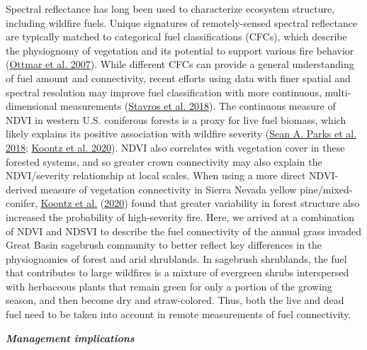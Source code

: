 \documentclass[
  12pt,
]{article}
\begin{document}
Spectral reflectance has long been used to characterize ecosystem
structure, including wildfire fuels. Unique signatures of
remotely-sensed spectral reflectance are typically matched to
categorical fuel classifications (CFCs), which describe the physiognomy
of vegetation and its potential to support various fire behavior
(\protect\hyperlink{ref-Ottmar2007}{Ottmar et al. 2007}). While
different CFCs can provide a general understanding of fuel amount and
connectivity, recent efforts using data with finer spatial and spectral
resolution may improve fuel classification with more continuous,
multi-dimensional measurements
(\protect\hyperlink{ref-Stavros2018}{Stavros et al. 2018}). The
continuous measure of NDVI in western U.S. coniferous forests is a proxy
for live fuel biomass, which likely explains its positive association
with wildfire severity (\protect\hyperlink{ref-Parks2018}{Sean A. Parks
et al. 2018}; \protect\hyperlink{ref-Koontz2020}{Koontz et al. 2020}).
NDVI also correlates with vegetation cover in these forested systems,
and so greater crown connectivity may also explain the NDVI/severity
relationship at local scales. When using a more direct NDVI-derived
measure of vegetation connectivity in Sierra Nevada yellow
pine/mixed-conifer, \protect\hyperlink{ref-Koontz2020}{Koontz et al.}
(\protect\hyperlink{ref-Koontz2020}{2020}) found that greater
variability in forest structure also increased the probability of
high-severity fire. Here, we arrived at a combination of NDVI and NDSVI
to describe the fuel connectivity of the annual grass invaded Great
Basin sagebrush community to better reflect key differences in the
physiognomies of forest and arid shrublands. In sagebrush shrublands,
the fuel that contributes to large wildfires is a mixture of evergreen
shrubs interspersed with herbaceous plants that remain green for only a
portion of the growing season, and then become dry and straw-colored.
Thus, both the live and dead fuel need to be taken into account in
remote measurements of fuel connectivity.

\textbf{\emph{Management implications}}
\end{document}
